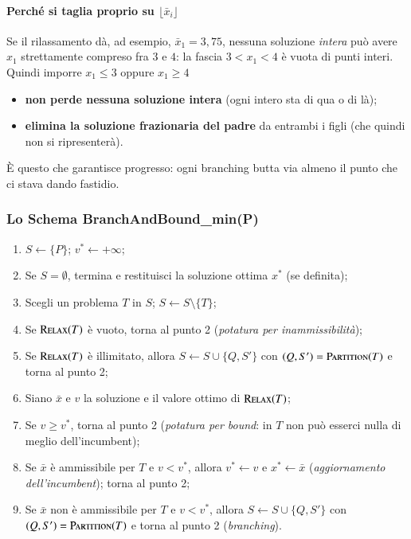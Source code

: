 \documentclass[12pt]{extarticle} %
\begin{document}
\paragraph{Perché si taglia proprio su $\lfloor \bar{x}_i \rfloor$}
Se il rilassamento dà, ad esempio, $\bar{x}_1 = 3{,}75$, nessuna soluzione \emph{intera} può avere $x_1$ strettamente compreso fra $3$ e $4$: la fascia $3 < x_1 < 4$ è vuota di punti interi. Quindi imporre $x_1 \le 3$ oppure $x_1 \ge 4$
\begin{itemize}
    \item \textbf{non perde nessuna soluzione intera} (ogni intero sta di qua o di là);
    \item \textbf{elimina la soluzione frazionaria del padre} da entrambi i figli (che quindi non si ripresenterà).
\end{itemize}
È questo che garantisce progresso: ogni branching butta via almeno il punto che ci stava dando fastidio.

\subsubsection{Lo Schema BranchAndBound\_min(P)}
\begin{enumerate}
    \item $S \leftarrow \{P\}$; $v^* \leftarrow +\infty$;
    \item Se $S = \emptyset$, termina e restituisci la soluzione ottima $x^*$ (se definita);
    \item Scegli un problema $T$ in $S$; $S \leftarrow S \setminus \{T\}$;
    \item Se $\textsc{Relax}(T)$ è vuoto, torna al punto 2 (\textit{potatura per inammissibilità});
    \item Se $\textsc{Relax}(T)$ è illimitato, allora $S \leftarrow S \cup \{Q,S'\}$ con $(Q,S') = \textsc{Partition}(T)$ e torna al punto 2;
    \item Siano $\bar{x}$ e $v$ la soluzione e il valore ottimo di $\textsc{Relax}(T)$;
    \item Se $v \ge v^*$, torna al punto 2 (\textit{potatura per bound}: in $T$ non può esserci nulla di meglio dell'incumbent);
    \item Se $\bar{x}$ è ammissibile per $T$ e $v < v^*$, allora $v^* \leftarrow v$ e $x^* \leftarrow \bar{x}$ (\textit{aggiornamento dell'incumbent}); torna al punto 2;
    \item Se $\bar{x}$ non è ammissibile per $T$ e $v < v^*$, allora $S \leftarrow S \cup \{Q,S'\}$ con $(Q,S') = \textsc{Partition}(T)$ e torna al punto 2 (\textit{branching}).
\end{enumerate}
\end{document}
